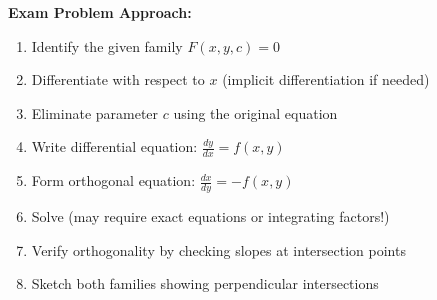 \documentclass[12pt]{article}
\begin{document}
\begin{algorithm}
\textbf{Exam Problem Approach:}
\begin{enumerate}
    \item Identify the given family $F(x,y,c) = 0$
    \item Differentiate with respect to $x$ (implicit differentiation if needed)
    \item Eliminate parameter $c$ using the original equation
    \item Write differential equation: $\frac{dy}{dx} = f(x,y)$
    \item Form orthogonal equation: $\frac{dx}{dy} = -f(x,y)$
    \item Solve (may require exact equations or integrating factors!)
    \item Verify orthogonality by checking slopes at intersection points
    \item Sketch both families showing perpendicular intersections
\end{enumerate}
\end{algorithm}
\end{document}
